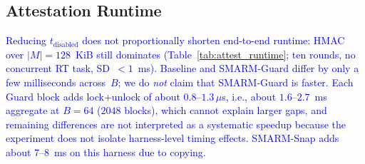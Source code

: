 \documentclass[conference]{IEEEtran}
\newcommand{\tdis}{$t_{\mathrm{disabled}}$\xspace}
\newcommand{\smarmcopy}{SMARM-Snap\xspace}
\newcommand{\smarmlock}{SMARM-Guard\xspace}
\newcommand\ben[1]{\textcolor{blue}{#1}}
\begin{document}
\subsection{Attestation Runtime}

%
%
%

\ben{Reducing \tdis{} does not proportionally shorten end-to-end runtime: HMAC over $|M|{=}128$~KiB still dominates (Table~\ref{tab:attest_runtime}; ten rounds, no concurrent RT task, SD~$<1$~ms). Baseline and \smarmlock{} differ by only a few milliseconds across~$B$; we do \emph{not} claim that \smarmlock{} is faster. Each Guard block adds lock{+}unlock of about $0.8$--$1.3\,\mu$s, i.e., about $1.6$--$2.7$~ms aggregate at $B{=}64$ ($2048$ blocks), which cannot explain larger gaps, and remaining differences are not interpreted as a systematic speedup because the experiment does not isolate harness-level timing effects. \smarmcopy{} adds about $7$--$8$~ms on this harness due to copying.}
\end{document}
